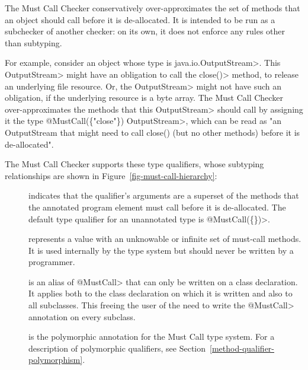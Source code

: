 \htmlhr
{}

The Must Call Checker conservatively over-approximates
the set of methods that an object should call before it is de-allocated.
It is intended to be run as a subchecker of another checker: on its own, it does not
enforce any rules other than subtyping.

For example, consider an object whose type is \<java.io.OutputStream>.
This \<OutputStream> might have an obligation to call the \<close()> method, to release an
underlying file resource. Or, the \<OutputStream> might not have such an obligation, if the
underlying resource is a byte array. The Must Call Checker over-approximates the methods that this
\<OutputStream> should call by assigning it the type \<@MustCall(\{"close"\}) OutputStream>, which can be read
as "an OutputStream that might need to call close() (but no other methods) before it is de-allocated".


The Must Call Checker supports these type qualifiers, whose subtyping relationships
are shown in Figure~\ref{fig-must-call-hierarchy}:

\begin{description}

\item[]
  indicates that the qualifier's arguments are a superset of the methods that the annotated program element
  must call before it is de-allocated.
  The default type qualifier for an unannotated type is \<@MustCall(\{\})>.

\item[]
  represents a value with an unknowable or infinite set of must-call methods.
  It is used internally by the type system but should never be written by a
  programmer.

\item[]
  is an alias of \<@MustCall> that can only be written on a class declaration.
  It applies both to the class declaration on which it is written and also to all subclasses.
  This freeing the user of the need to write the \<@MustCall> annotation on every subclass.

\item[]
  is the polymorphic annotation for the Must Call type system.
  For a description of polymorphic qualifiers, see
  Section~\ref{method-qualifier-polymorphism}.

\end{description}

